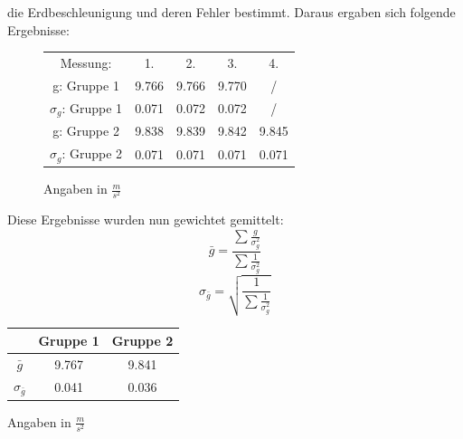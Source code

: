 \documentclass[12pt,a4paper]{article}
\begin{document}
die Erdbeschleunigung und deren Fehler bestimmt.
Daraus ergaben sich folgende Ergebnisse:
\begin{figure}[H]\centering
\begin{tabular}{c|c|c|c|c}
Messung: & 1. & 2. & 3. & 4. \\ 
g: Gruppe 1 & 9.766 & 9.766 & 9.770 & / \\ 
$\sigma_g$: Gruppe 1 & 0.071 & 0.072 & 0.072 & / \\ 
g: Gruppe 2 & 9.838 & 9.839 & 9.842 & 9.845 \\ 
$\sigma_g$: Gruppe 2 & 0.071 & 0.071 & 0.071 & 0.071 \\ 
\end{tabular} 
\newline
\newline
Angaben in $\frac{m}{s^2}$
\end{figure}

Diese Ergebnisse wurden nun gewichtet gemittelt:
\begin{equation}
\bar{g} = \frac{\sum{\frac{g}{\sigma_g^2}}}{\sum{\frac{1}{\sigma_g^2}}}
\end{equation}
\begin{equation}
\sigma_{\bar{g}} = \sqrt{\frac{1}{\sum{\frac{1}{\sigma_g^2}}}}
\end{equation}
\begin{center}
\begin{tabular}{c|c|c}
 & Gruppe 1 & Gruppe 2 \\ 
\hline 
$\bar{g}$ & 9.767 & 9.841 \\ 
$\sigma_{\bar{g}}$ & 0.041 & 0.036 \\ 
\end{tabular} 
\newline
\newline
Angaben in $\frac{m}{s^2}$
\end{center}


\newpage
\end{document}
